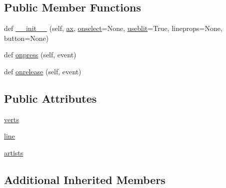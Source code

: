 \subsection*{Public Member Functions}
\begin{DoxyCompactItemize}
\item 
def \hyperlink{classmatplotlib_1_1widgets_1_1LassoSelector_a90fd4fad181512ce9e21637bc815b754}{\+\_\+\+\_\+init\+\_\+\+\_\+} (self, \hyperlink{classmatplotlib_1_1widgets_1_1AxesWidget_ac0722858b7001d10a42055dc90420b4f}{ax}, \hyperlink{classmatplotlib_1_1widgets_1_1__SelectorWidget_ad893af1ad010d595c7cce1106b48d854}{onselect}=None, \hyperlink{classmatplotlib_1_1widgets_1_1__SelectorWidget_a6d178ef2dd7ec61c11b18302de3f43bf}{useblit}=True, lineprops=None, button=None)
\item 
def \hyperlink{classmatplotlib_1_1widgets_1_1LassoSelector_aa66e59967f19252ca2aeb7ea54b97bdc}{onpress} (self, event)
\item 
def \hyperlink{classmatplotlib_1_1widgets_1_1LassoSelector_ac137b87f674424a15c51511736ac97dd}{onrelease} (self, event)
\end{DoxyCompactItemize}
\subsection*{Public Attributes}
\begin{DoxyCompactItemize}
\item 
\hyperlink{classmatplotlib_1_1widgets_1_1LassoSelector_add746361d68e54e767ba133d12523a18}{verts}
\item 
\hyperlink{classmatplotlib_1_1widgets_1_1LassoSelector_a157e7a28352fd772a8179ab409210549}{line}
\item 
\hyperlink{classmatplotlib_1_1widgets_1_1LassoSelector_a610b9fe6d5c84fede3f9837cd04cf2ea}{artists}
\end{DoxyCompactItemize}
\subsection*{Additional Inherited Members}


